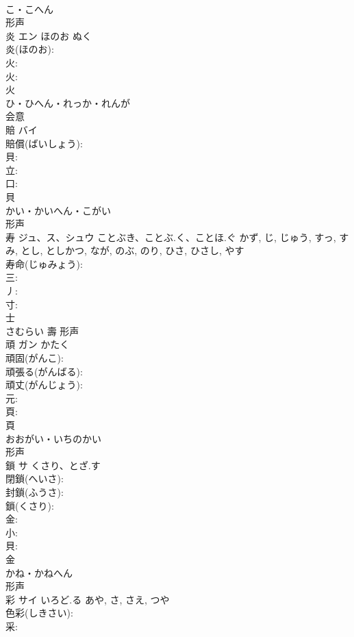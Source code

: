 \documentclass[8pt]{extreport}
\begin{document}
\begin{CJK}{UTF8}{min}
\\	こ・こへん	
\\	形声 
\\	炎	エン	ほのお	ぬく	
\\	炎(ほのお): 
\\	火: 
\\	火: 
\\	火	
\\	ひ・ひへん・れっか・れんが	
\\	会意 
\\	賠	バイ			
\\	賠償(ばいしょう): 
\\	貝: 
\\	立: 
\\	口: 
\\	貝	
\\	かい・かいへん・こがい	
\\	形声 
\\	寿	ジュ、ス、シュウ	ことぶき、ことぶ.く、ことほ.ぐ	かず, じ, じゅう, すっ, すみ, とし, としかつ, なが, のぶ, のり, ひさ, ひさし, やす	
\\	寿命(じゅみょう): 
\\	三: 
\\	丿: 
\\	寸: 
\\	士	
\\	さむらい	壽	形声 
\\	頑	ガン	かたく		
\\	頑固(がんこ): 
\\	頑張る(がんばる): 
\\	頑丈(がんじょう): 
\\	元: 
\\	頁: 
\\	頁	
\\	おおがい・いちのかい	
\\	形声 
\\	鎖	サ	くさり、とざ.す		
\\	閉鎖(へいさ): 
\\	封鎖(ふうさ): 
\\	鎖(くさり): 
\\	金: 
\\	小: 
\\	貝: 
\\	金	
\\	かね・かねへん	
\\	形声 
\\	彩	サイ	いろど.る	あや, さ, さえ, つや	
\\	色彩(しきさい): 
\\	采: 

\end{CJK}
\end{document}
